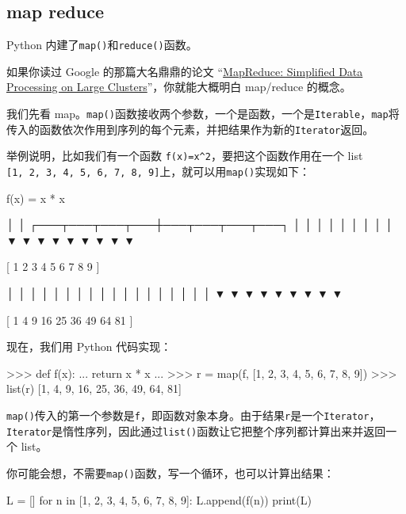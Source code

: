 \hypertarget{map-reduce}{%
\subsection{map reduce}\label{map-reduce}}

Python 内建了\texttt{map()}和\texttt{reduce()}函数。

如果你读过 Google 的那篇大名鼎鼎的论文
``\href{http://research.google.com/archive/mapreduce.html}{MapReduce:
Simplified Data Processing on Large Clusters}''，你就能大概明白
map/reduce 的概念。

我们先看
map。\texttt{map()}函数接收两个参数，一个是函数，一个是\texttt{Iterable}，\texttt{map}将传入的函数依次作用到序列的每个元素，并把结果作为新的\texttt{Iterator}返回。

举例说明，比如我们有一个函数
\texttt{f(x)=x\^{}2}，要把这个函数作用在一个 list
\texttt{{[}1,\ 2,\ 3,\ 4,\ 5,\ 6,\ 7,\ 8,\ 9{]}}上，就可以用\texttt{map()}实现如下：

\begin{pythoncode}
            f(x) = x * x

                  │
                  │
  ┌───┬───┬───┬───┼───┬───┬───┬───┐
  │   │   │   │   │   │   │   │   │
  ▼   ▼   ▼   ▼   ▼   ▼   ▼   ▼   ▼

[ 1   2   3   4   5   6   7   8   9 ]

  │   │   │   │   │   │   │   │   │
  │   │   │   │   │   │   │   │   │
  ▼   ▼   ▼   ▼   ▼   ▼   ▼   ▼   ▼

[ 1   4   9  16  25  36  49  64  81 ]
\end{pythoncode}

现在，我们用 Python 代码实现：

\begin{pythoncode}
>>> def f(x):
...     return x * x
...
>>> r = map(f, [1, 2, 3, 4, 5, 6, 7, 8, 9])
>>> list(r)
[1, 4, 9, 16, 25, 36, 49, 64, 81]
\end{pythoncode}

\texttt{map()}传入的第一个参数是\texttt{f}，即函数对象本身。由于结果\texttt{r}是一个\texttt{Iterator}，\texttt{Iterator}是惰性序列，因此通过\texttt{list()}函数让它把整个序列都计算出来并返回一个
list。

你可能会想，不需要\texttt{map()}函数，写一个循环，也可以计算出结果：

\begin{pythoncode}
L = []
for n in [1, 2, 3, 4, 5, 6, 7, 8, 9]:
    L.append(f(n))
print(L)
\end{pythoncode}

